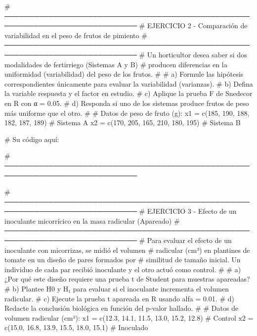 \documentclass[
  spanish,
  letterpaper,
  DIV=11,
  numbers=noendperiod]{scrreprt}
\newenvironment{Shaded}{\begin{snugshade}}{\end{snugshade}}
\newcommand{\CommentTok}[1]{\textcolor[rgb]{0.37,0.37,0.37}{#1}}
\newcommand{\DecValTok}[1]{\textcolor[rgb]{0.68,0.00,0.00}{#1}}
\newcommand{\FloatTok}[1]{\textcolor[rgb]{0.68,0.00,0.00}{#1}}
\newcommand{\FunctionTok}[1]{\textcolor[rgb]{0.28,0.35,0.67}{#1}}
\newcommand{\NormalTok}[1]{\textcolor[rgb]{0.00,0.23,0.31}{#1}}
\newcommand{\OtherTok}[1]{\textcolor[rgb]{0.00,0.23,0.31}{#1}}
\begin{document}
\begin{Shaded}
\begin{Highlighting}[]
\CommentTok{\# ─────────────────────────────────────────────────────────────────────────────}
\CommentTok{\# EJERCICIO 2 {-} Comparación de variabilidad en el peso de frutos de pimiento}
\CommentTok{\# ─────────────────────────────────────────────────────────────────────────────}
\CommentTok{\# Un horticultor desea saber si dos modalidades de fertirriego (Sistemas A y B)}
\CommentTok{\# producen diferencias en la uniformidad (variabilidad) del peso de los frutos.}
\CommentTok{\#}
\CommentTok{\# a) Formule las hipótesis correspondientes únicamente para evaluar la variabilidad (varianzas).}
\CommentTok{\# b) Defina la variable respuesta y el factor en estudio.}
\CommentTok{\# c) Aplique la prueba F de Snedecor en R con α = 0.05.}
\CommentTok{\# d) Responda si uno de los sistemas produce frutos de peso más uniforme que el otro.}
\CommentTok{\#}
\CommentTok{\# Datos de peso de fruto (g):}
\NormalTok{x1 }\OtherTok{=} \FunctionTok{c}\NormalTok{(}\DecValTok{185}\NormalTok{, }\DecValTok{190}\NormalTok{, }\DecValTok{188}\NormalTok{, }\DecValTok{182}\NormalTok{, }\DecValTok{187}\NormalTok{, }\DecValTok{189}\NormalTok{)   }\CommentTok{\# Sistema A}
\NormalTok{x2 }\OtherTok{=} \FunctionTok{c}\NormalTok{(}\DecValTok{170}\NormalTok{, }\DecValTok{205}\NormalTok{, }\DecValTok{165}\NormalTok{, }\DecValTok{210}\NormalTok{, }\DecValTok{180}\NormalTok{, }\DecValTok{195}\NormalTok{)   }\CommentTok{\# Sistema B}

\CommentTok{\# Su código aquí:}

\CommentTok{\# ─────────────────────────────────────────────────────────────────────────────}


\CommentTok{\# ─────────────────────────────────────────────────────────────────────────────}
\CommentTok{\# EJERCICIO 3 {-} Efecto de un inoculante micorrícico en la masa radicular (Apareado)}
\CommentTok{\# ─────────────────────────────────────────────────────────────────────────────}
\CommentTok{\# Para evaluar el efecto de un inoculante con micorrizas, se midió el volumen}
\CommentTok{\# radicular (cm³) en plantines de tomate en un diseño de pares formados por}
\CommentTok{\# similitud de tamaño inicial. Un individuo de cada par recibió inoculante y el otro actuó como control.}
\CommentTok{\#}
\CommentTok{\# a) ¿Por qué este diseño requiere una prueba t de Student para muestras apareadas?}
\CommentTok{\# b) Plantee H0 y H₁ para evaluar si el inoculante incrementa el volumen radicular.}
\CommentTok{\# c) Ejecute la prueba t apareada en R usando alfa = 0.01.}
\CommentTok{\# d) Redacte la conclusión biológica en función del p{-}valor hallado.}
\CommentTok{\#}
\CommentTok{\# Datos de volumen radicular (cm³):}
\NormalTok{x1 }\OtherTok{=} \FunctionTok{c}\NormalTok{(}\FloatTok{12.3}\NormalTok{, }\FloatTok{14.1}\NormalTok{, }\FloatTok{11.5}\NormalTok{, }\FloatTok{13.0}\NormalTok{, }\FloatTok{15.2}\NormalTok{, }\FloatTok{12.8}\NormalTok{)   }\CommentTok{\# Control}
\NormalTok{x2 }\OtherTok{=} \FunctionTok{c}\NormalTok{(}\FloatTok{15.0}\NormalTok{, }\FloatTok{16.8}\NormalTok{, }\FloatTok{13.9}\NormalTok{, }\FloatTok{15.5}\NormalTok{, }\FloatTok{18.0}\NormalTok{, }\FloatTok{15.1}\NormalTok{)   }\CommentTok{\# Inoculado}


\end{Highlighting}
\end{Shaded}
\end{document}
